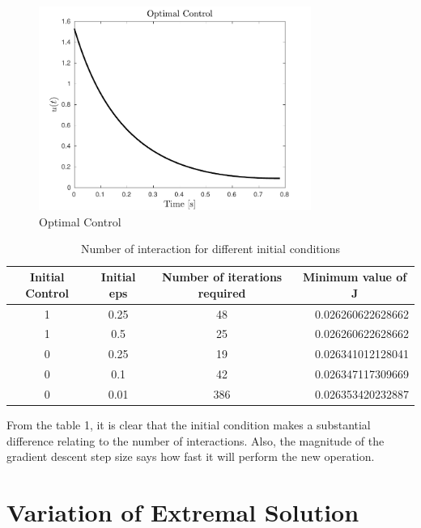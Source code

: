 \documentclass{article}
\begin{document}
\begin{figure}[H]
\centering
\includegraphics [width=3.5in]{fig3}
\caption{Optimal Control}
\end{figure}

\begin{table}[H]
\centering
\caption{Number of interaction for different initial conditions}
\label{my-label}
\begin{tabular}{cccr} \hline
Initial Control & Initial eps & Number of iterations required & \multicolumn{1}{c}{Minimum value of J} \\ \hline
1               & 0.25        & 48                            & 0.026260622628662                      \\
1               & 0.5         & 25                            & 0.026260622628662                      \\
0               & 0.25        & 19                            & 0.026341012128041                      \\
0               & 0.1         & 42                            & 0.026347117309669                      \\
0               & 0.01        & 386                           & 0.026353420232887        \\
\hline             
\end{tabular}
\end{table}

From the table 1, it is clear that the initial condition makes a substantial difference relating to the number of interactions. Also, the magnitude of the gradient descent step size says how fast it will perform the new operation.

\section{Variation of Extremal Solution}
\end{document}
